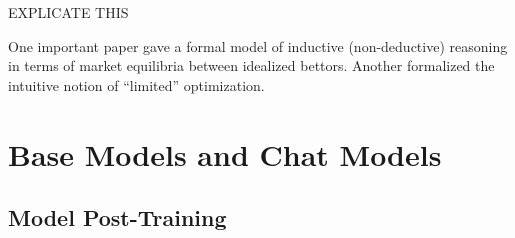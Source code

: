 EXPLICATE THIS

One important paper gave a formal model of inductive (non-deductive) reasoning
in terms of market equilibria between idealized bettors. Another formalized the
intuitive notion of ``limited'' optimization.

\section{Base Models and Chat Models}

\subsection{Model Post-Training}

\cite{askell2021assistant}
\cite{nostalgebraist2025void}


\cite{bai2022training}
\cite{bai2022constitutional}
\cite{sharma2025sycophancy}


